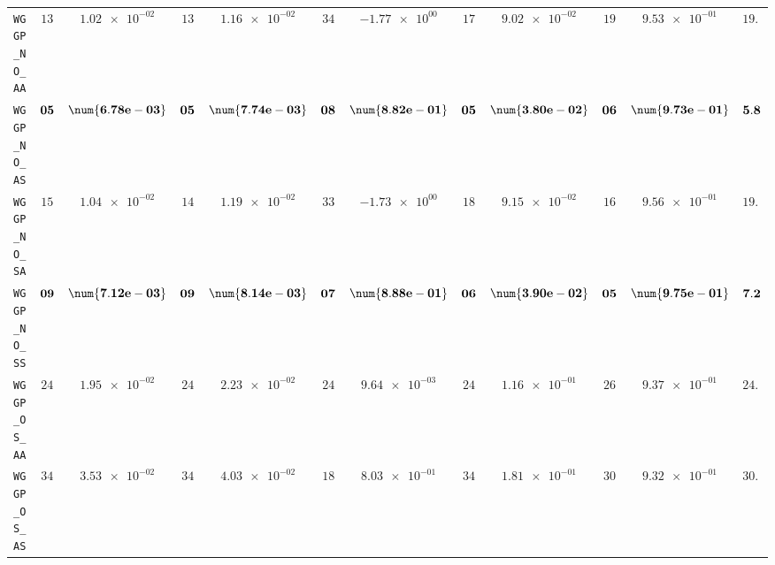 \begin{xltabular}{\textwidth}{l||cC|cC|cC|cC|cC||c}
	\texttt{WGGP\_NO\_AA} & $ 13$ & $ \num{1.02e-02}$ & $ 13$ & $ \num{1.16e-02}$ & $ 34$ & $ \num{-1.77e+00}$ & $ 17$ & $ \num{9.02e-02}$ & $ 19$ & $ \num{9.53e-01}$ & $ 19.2$  \\
	\texttt{WGGP\_NO\_AS} & $\bf 05$ & $\bf \num{6.78e-03}$ & $\bf 05$ & $\bf \num{7.74e-03}$ & $\bf 08$ & $\bf \num{8.82e-01}$ & $\bf 05$ & $\bf \num{3.80e-02}$ & $\bf 06$ & $\bf \num{9.73e-01}$ & $\bf 5.8$  \\
	\texttt{WGGP\_NO\_SA} & $ 15$ & $ \num{1.04e-02}$ & $ 14$ & $ \num{1.19e-02}$ & $ 33$ & $ \num{-1.73e+00}$ & $ 18$ & $ \num{9.15e-02}$ & $ 16$ & $ \num{9.56e-01}$ & $ 19.2$  \\
	\texttt{WGGP\_NO\_SS} & $\bf 09$ & $\bf \num{7.12e-03}$ & $\bf 09$ & $\bf \num{8.14e-03}$ & $\bf 07$ & $\bf \num{8.88e-01}$ & $\bf 06$ & $\bf \num{3.90e-02}$ & $\bf 05$ & $\bf \num{9.75e-01}$ & $\bf 7.2$  \\
	\texttt{WGGP\_OS\_AA} & $ 24$ & $ \num{1.95e-02}$ & $ 24$ & $ \num{2.23e-02}$ & $ 24$ & $ \num{9.64e-03}$ & $ 24$ & $ \num{1.16e-01}$ & $ 26$ & $ \num{9.37e-01}$ & $ 24.4$  \\
	\texttt{WGGP\_OS\_AS} & $ 34$ & $ \num{3.53e-02}$ & $ 34$ & $ \num{4.03e-02}$ & $ 18$ & $ \num{8.03e-01}$ & $ 34$ & $ \num{1.81e-01}$ & $ 30$ & $ \num{9.32e-01}$ & $ 30.0$  \\

\end{xltabular}
